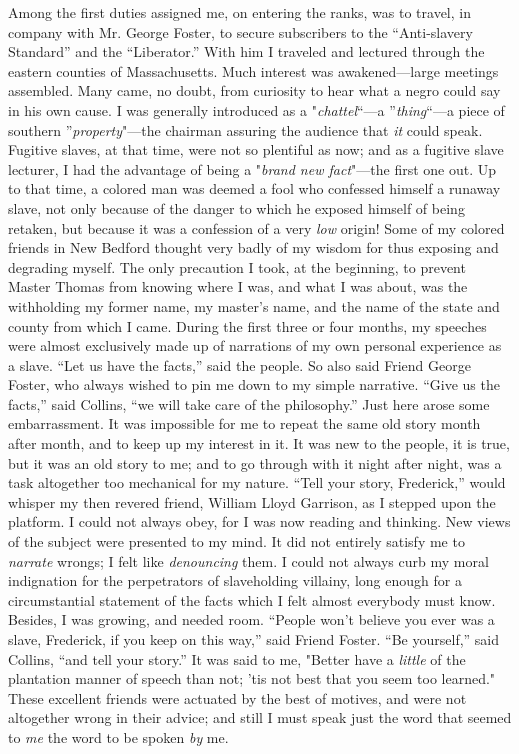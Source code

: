 Among the first duties assigned me, on entering the ranks, was to
travel, in company with Mr. George Foster, to secure subscribers to the
``Anti-slavery Standard'' and the ``Liberator.'' With him I traveled and
lectured through the eastern counties of Massachusetts. Much interest
was awakened---large meetings assembled. Many came, no doubt, from
curiosity to hear what a negro could say in his own cause. I was
generally introduced as a "\emph{chattel}``---a ''\emph{thing}``---a
piece of southern ''\emph{property}"---the chairman assuring the
audience that \emph{it} could speak. {}Fugitive slaves, at that time,
were not so plentiful as now; and as a fugitive slave lecturer, I had
the advantage of being a "\emph{brand new fact}"---the first one out. Up
to that time, a colored man was deemed a fool who confessed himself a
runaway slave, not only because of the danger to which he exposed
himself of being retaken, but because it was a confession of a very
\emph{low} origin! Some of my colored friends in New Bedford thought
very badly of my wisdom for thus exposing and degrading myself. The only
precaution I took, at the beginning, to prevent Master Thomas from
knowing where I was, and what I was about, was the withholding my former
name, my master's name, and the name of the state and county from which
I came. During the first three or four months, my speeches were almost
exclusively made up of narrations of my own personal experience as a
slave. ``Let us have the facts,'' said the people. So also said Friend
George Foster, who always wished to pin me down to my simple narrative.
``Give us the facts,'' said Collins, ``we will take care of the
philosophy.'' Just here arose some embarrassment. It was impossible for
me to repeat the same old story month after month, and to keep up my
interest in it. It was new to the people, it is true, but it was an old
story to me; and to go through with it night after night, was a task
altogether too mechanical for my nature. ``Tell your story, Frederick,''
would whisper my then revered friend, William Lloyd Garrison, as I
stepped upon the platform. I could not always obey, for I was now
reading and thinking. New views of the subject were presented to my
mind. It {}did not entirely satisfy me to \emph{narrate} wrongs; I felt
like \emph{denouncing} them. I could not always curb my moral
indignation for the perpetrators of slaveholding villainy, long enough
for a circumstantial statement of the facts which I felt almost
everybody must know. Besides, I was growing, and needed room. ``People
won't believe you ever was a slave, Frederick, if you keep on this
way,'' said Friend Foster. ``Be yourself,'' said Collins, ``and tell
your story.'' It was said to me, "Better have a \emph{little} of the
plantation manner of speech than not; 'tis not best that you seem too
learned." These excellent friends were actuated by the best of motives,
and were not altogether wrong in their advice; and still I must speak
just the word that seemed to \emph{me} the word to be spoken \emph{by}
me.

